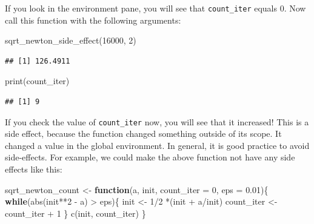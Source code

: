 \documentclass[
]{article}
\newenvironment{Shaded}{\begin{snugshade}}{\end{snugshade}}
\newcommand{\AttributeTok}[1]{\textcolor[rgb]{0.77,0.63,0.00}{#1}}
\newcommand{\ControlFlowTok}[1]{\textcolor[rgb]{0.13,0.29,0.53}{\textbf{#1}}}
\newcommand{\DecValTok}[1]{\textcolor[rgb]{0.00,0.00,0.81}{#1}}
\newcommand{\FloatTok}[1]{\textcolor[rgb]{0.00,0.00,0.81}{#1}}
\newcommand{\FunctionTok}[1]{\textcolor[rgb]{0.00,0.00,0.00}{#1}}
\newcommand{\NormalTok}[1]{#1}
\newcommand{\OtherTok}[1]{\textcolor[rgb]{0.56,0.35,0.01}{#1}}
\newcommand{\SpecialCharTok}[1]{\textcolor[rgb]{0.00,0.00,0.00}{#1}}
\begin{document}
If you look in the environment pane, you will see that \texttt{count\_iter} equals 0. Now call this
function with the following arguments:

\begin{Shaded}
\begin{Highlighting}[]
\FunctionTok{sqrt\_newton\_side\_effect}\NormalTok{(}\DecValTok{16000}\NormalTok{, }\DecValTok{2}\NormalTok{)}
\end{Highlighting}
\end{Shaded}

\begin{verbatim}
## [1] 126.4911
\end{verbatim}

\begin{Shaded}
\begin{Highlighting}[]
\FunctionTok{print}\NormalTok{(count\_iter)}
\end{Highlighting}
\end{Shaded}

\begin{verbatim}
## [1] 9
\end{verbatim}

If you check the value of \texttt{count\_iter} now, you will see that it increased! This is a side effect,
because the function changed something outside of its scope. It changed a value in the global
environment. In general, it is good practice to avoid side-effects. For example, we could make the
above function not have any side effects like this:

\begin{Shaded}
\begin{Highlighting}[]
\NormalTok{sqrt\_newton\_count }\OtherTok{\textless{}{-}} \ControlFlowTok{function}\NormalTok{(a, init, }\AttributeTok{count\_iter =} \DecValTok{0}\NormalTok{, }\AttributeTok{eps =} \FloatTok{0.01}\NormalTok{)\{}
    \ControlFlowTok{while}\NormalTok{(}\FunctionTok{abs}\NormalTok{(init}\SpecialCharTok{**}\DecValTok{2} \SpecialCharTok{{-}}\NormalTok{ a) }\SpecialCharTok{\textgreater{}}\NormalTok{ eps)\{}
\NormalTok{        init }\OtherTok{\textless{}{-}} \DecValTok{1}\SpecialCharTok{/}\DecValTok{2} \SpecialCharTok{*}\NormalTok{(init }\SpecialCharTok{+}\NormalTok{ a}\SpecialCharTok{/}\NormalTok{init)}
\NormalTok{        count\_iter }\OtherTok{\textless{}{-}}\NormalTok{ count\_iter }\SpecialCharTok{+} \DecValTok{1}
\NormalTok{    \}}
    \FunctionTok{c}\NormalTok{(init, count\_iter)}
\NormalTok{\}}
\end{Highlighting}
\end{Shaded}
\end{document}
